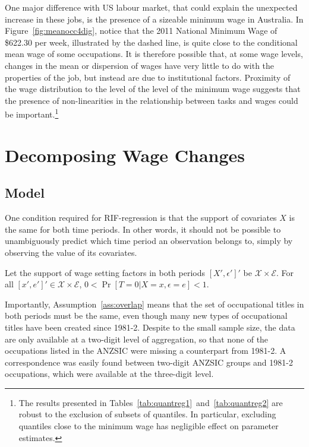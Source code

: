 One major difference with US labour market, that could explain the unexpected increase in these jobs, is the presence of a sizeable minimum wage in Australia. In Figure~\ref{fig:meanocc4dig}, notice that the 2011 National Minimum Wage of \$622.30 per week, illustrated by the dashed line, is quite close to the conditional mean wage of some occupations. It is therefore possible that, at some wage levels, changes in the mean or dispersion of wages have very little to do with the properties of the job, but instead are due to institutional factors. Proximity of the wage distribution to the level of the level of the minimum wage suggests that the presence of non-linearities in the relationship between tasks and wages could be important.\footnote{The results presented in Tables~\ref{tab:quantreg1}~and~\ref{tab:quantreg2} are robust to the exclusion of subsets of quantiles. In particular, excluding quantiles close to the minimum wage has negligible effect on parameter estimates.}

\section{Decomposing Wage Changes}




\subsection{Model} \label{sec:id}

One condition required for RIF-regression is that the support of covariates $X$ is the same for both time periods. In other words, it should not be possible to unambiguously predict which time period an observation belongs to, simply by observing the value of its covariates. 
\begin{assumption} \label{ass:overlap}
  Let the support of wage setting factors in both periods $[X',\epsilon']'$ be $\mathcal{X}\times\mathcal{E}$. For all $[x',e']' \in \mathcal{X}\times\mathcal{E}$,  $0 < \Pr[T=0 | X=x, \epsilon=e] < 1$.
\end{assumption}
Importantly, Assumption~\ref{ass:overlap} means that the set of occupational titles in both periods must be the same, even though many new types of occupational titles have been created since 1981-2. Despite to the small sample size, the data are only available at a two-digit level of aggregation, so that none of the occupations listed in the ANZSIC were missing a counterpart from 1981-2. A correspondence was easily found between two-digit ANZSIC groups and 1981-2 occupations, which were available at the three-digit level.

